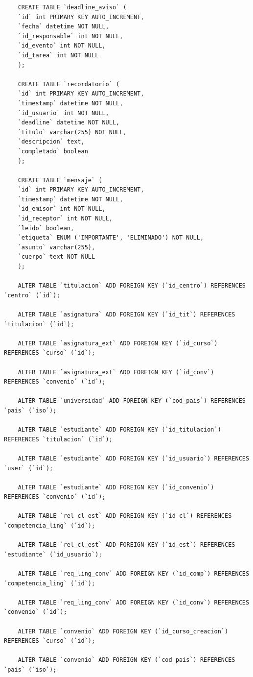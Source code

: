 \begin{verbatim}
	CREATE TABLE `deadline_aviso` (
	`id` int PRIMARY KEY AUTO_INCREMENT,
	`fecha` datetime NOT NULL,
	`id_responsable` int NOT NULL,
	`id_evento` int NOT NULL,
	`id_tarea` int NOT NULL
	);
	
	CREATE TABLE `recordatorio` (
	`id` int PRIMARY KEY AUTO_INCREMENT,
	`timestamp` datetime NOT NULL,
	`id_usuario` int NOT NULL,
	`deadline` datetime NOT NULL,
	`titulo` varchar(255) NOT NULL,
	`descripcion` text,
	`completado` boolean
	);
	
	CREATE TABLE `mensaje` (
	`id` int PRIMARY KEY AUTO_INCREMENT,
	`timestamp` datetime NOT NULL,
	`id_emisor` int NOT NULL,
	`id_receptor` int NOT NULL,
	`leido` boolean,
	`etiqueta` ENUM ('IMPORTANTE', 'ELIMINADO') NOT NULL,
	`asunto` varchar(255),
	`cuerpo` text NOT NULL
	);
	
	ALTER TABLE `titulacion` ADD FOREIGN KEY (`id_centro`) REFERENCES `centro` (`id`);
	
	ALTER TABLE `asignatura` ADD FOREIGN KEY (`id_tit`) REFERENCES `titulacion` (`id`);
	
	ALTER TABLE `asignatura_ext` ADD FOREIGN KEY (`id_curso`) REFERENCES `curso` (`id`);
	
	ALTER TABLE `asignatura_ext` ADD FOREIGN KEY (`id_conv`) REFERENCES `convenio` (`id`);
	
	ALTER TABLE `universidad` ADD FOREIGN KEY (`cod_pais`) REFERENCES `pais` (`iso`);
	
	ALTER TABLE `estudiante` ADD FOREIGN KEY (`id_titulacion`) REFERENCES `titulacion` (`id`);
	
	ALTER TABLE `estudiante` ADD FOREIGN KEY (`id_usuario`) REFERENCES `user` (`id`);
	
	ALTER TABLE `estudiante` ADD FOREIGN KEY (`id_convenio`) REFERENCES `convenio` (`id`);
	
	ALTER TABLE `rel_cl_est` ADD FOREIGN KEY (`id_cl`) REFERENCES `competencia_ling` (`id`);
	
	ALTER TABLE `rel_cl_est` ADD FOREIGN KEY (`id_est`) REFERENCES `estudiante` (`id_usuario`);
	
	ALTER TABLE `req_ling_conv` ADD FOREIGN KEY (`id_comp`) REFERENCES `competencia_ling` (`id`);
	
	ALTER TABLE `req_ling_conv` ADD FOREIGN KEY (`id_conv`) REFERENCES `convenio` (`id`);
	
	ALTER TABLE `convenio` ADD FOREIGN KEY (`id_curso_creacion`) REFERENCES `curso` (`id`);
	
	ALTER TABLE `convenio` ADD FOREIGN KEY (`cod_pais`) REFERENCES `pais` (`iso`);
	

\end{verbatim}
